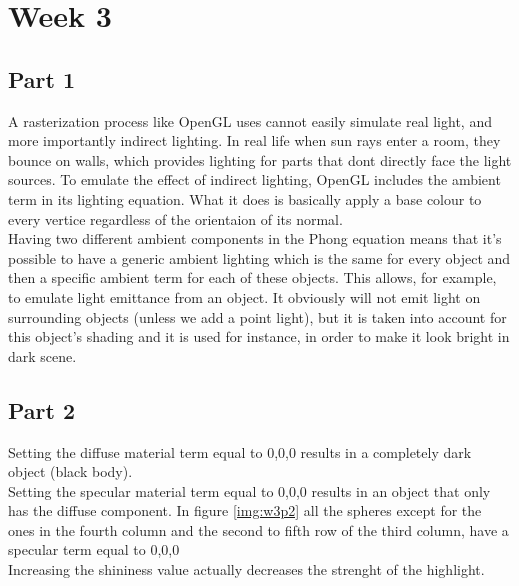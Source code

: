 \chapter{Week 3}

\section{Part 1}

A rasterization process like OpenGL uses cannot easily simulate real light, and
more importantly indirect lighting. In real life when sun rays enter a room, they
bounce on walls, which provides lighting for parts that dont directly face the light
sources. To emulate the effect of indirect lighting, OpenGL includes the ambient
term in its lighting equation. What it does is basically apply a base colour to
every vertice regardless of the orientaion of its normal. \\
Having two different ambient components in the Phong equation means that it's possible to have a generic ambient lighting which
is the same for every object and then a specific ambient term for each of these objects. This allows, for example, to emulate
light emittance from an object. It obviously will not emit light on surrounding objects (unless we add a point light), but it is taken into account for this object's shading and it is used for instance, in order to make it look bright in dark scene. 

\section{Part 2}

Setting the diffuse material term equal to 0,0,0 results in a completely dark object (black body).\\ 
Setting the specular material term equal to 0,0,0 results in an object that only has the diffuse component. In figure \ref{img:w3p2} all the spheres except for the ones in the fourth column and the second to fifth row of the third column, have a specular term equal to 0,0,0\\
Increasing the shininess value actually decreases the strenght of the highlight.  


